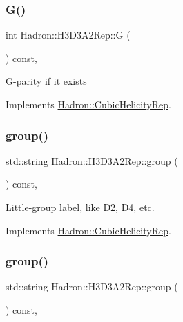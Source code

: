 \subsubsection{\texorpdfstring{G()}{G()}\hspace{0.1cm}{\footnotesize\ttfamily [3/3]}}
{\footnotesize\ttfamily int Hadron\+::\+H3\+D3\+A2\+Rep\+::G (\begin{DoxyParamCaption}{ }\end{DoxyParamCaption}) const\hspace{0.3cm}{\ttfamily [inline]}, {\ttfamily [virtual]}}

G-\/parity if it exists 

Implements \mbox{\hyperlink{structHadron_1_1CubicHelicityRep_a50689f42be1e6170aa8cf6ad0597018b}{Hadron\+::\+Cubic\+Helicity\+Rep}}.

\mbox{\label{structHadron_1_1H3D3A2Rep_ab7175e896239ed28493bfe574e0b6b9e}} 
\subsubsection{\texorpdfstring{group()}{group()}\hspace{0.1cm}{\footnotesize\ttfamily [1/5]}}
{\footnotesize\ttfamily std\+::string Hadron\+::\+H3\+D3\+A2\+Rep\+::group (\begin{DoxyParamCaption}{ }\end{DoxyParamCaption}) const\hspace{0.3cm}{\ttfamily [inline]}, {\ttfamily [virtual]}}

Little-\/group label, like D2, D4, etc. 

Implements \mbox{\hyperlink{structHadron_1_1CubicHelicityRep_a101a7d76cd8ccdad0f272db44b766113}{Hadron\+::\+Cubic\+Helicity\+Rep}}.

\mbox{\label{structHadron_1_1H3D3A2Rep_ab7175e896239ed28493bfe574e0b6b9e}} 
\subsubsection{\texorpdfstring{group()}{group()}\hspace{0.1cm}{\footnotesize\ttfamily [2/5]}}
{\footnotesize\ttfamily std\+::string Hadron\+::\+H3\+D3\+A2\+Rep\+::group (\begin{DoxyParamCaption}{ }\end{DoxyParamCaption}) const\hspace{0.3cm}{\ttfamily [inline]}, {\ttfamily [virtual]}}

